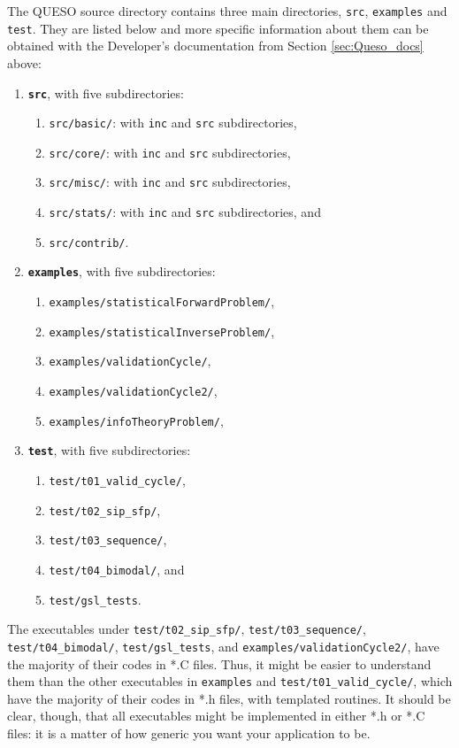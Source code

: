 The QUESO source directory contains three main directories, \texttt{src}, \texttt{examples} and \texttt{test}. They are listed below and more specific
information about them can be obtained with the Developer's documentation from Section \ref{sec:Queso_docs} above:
\begin{enumerate}
\item \texttt{\bf src}, with five subdirectories:
\begin{enumerate}
\item \texttt{src/basic/}: with \texttt{inc} and \texttt{src} subdirectories,
\item \texttt{src/core/}:  with \texttt{inc} and \texttt{src} subdirectories,
\item \texttt{src/misc/}:  with \texttt{inc} and \texttt{src} subdirectories,
\item \texttt{src/stats/}: with \texttt{inc} and \texttt{src} subdirectories, and
\item \texttt{src/contrib/}.
\end{enumerate}

\item \texttt{\bf examples}, with five subdirectories:
\begin{enumerate}
\item \texttt{examples/statisticalForwardProblem/},
\item \texttt{examples/statisticalInverseProblem/},
\item \texttt{examples/validationCycle/}, 
\item \texttt{examples/validationCycle2/},
\item \texttt{examples/infoTheoryProblem/},
\end{enumerate}

\item  \texttt{\bf test}, with five subdirectories:
\begin{enumerate}
\item \texttt{test/t01\_valid\_cycle/},
\item \texttt{test/t02\_sip\_sfp/},
\item \texttt{test/t03\_sequence/}, 
\item \texttt{test/t04\_bimodal/}, and
\item \texttt{test/gsl\_tests}.
\end{enumerate}

\end{enumerate}


The executables under \texttt{test/t02\_sip\_sfp/},  \texttt{test/t03\_sequence/}, \texttt{test/t04\_bimodal/},   \texttt{test/gsl\_tests}, and \texttt{examples/validationCycle2/}, have the majority of their codes in *.C files.
Thus, it might be easier to understand them than the other executables in  \texttt{examples} and \texttt{test/t01\_valid\_cycle/}, which
have the majority of their codes in *.h files, with templated routines.
It should be clear, though, that all executables might be implemented in either *.h or *.C files: it is a matter of how generic you want your application to be.


